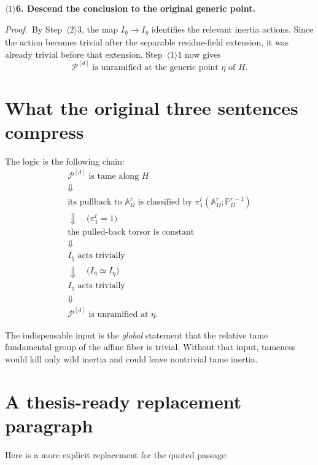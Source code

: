 \documentclass[11pt]{article}
\newcommand{\cP}{\mathcal P}
\newcommand{\step}[2]{\par\medskip\noindent
  \textcolor{heading}{\textbf{\(\langle #1\rangle\)#2}}\quad}
\newcommand{\pf}{\par\smallskip\noindent\textit{Proof.}\ }
\begin{document}
\step{1}{6. Descend the conclusion to the original generic point.}

\pf By Step~$\langle2\rangle3$, the map
$I_{\bar\eta}\to I_\eta$ identifies the relevant inertia actions.  Since
the action becomes trivial after the separable residue-field extension, it
was already trivial before that extension.  Step~$\langle1\rangle1$ now
gives
\[
  \boxed{\cP^{[d]}\text{ is unramified at the generic point }\eta\text{ of }H.}
\]

\section*{What the original three sentences compress}

The logic is the following chain:
\[
\begin{gathered}
  \text{$\cP^{[d]}$ is tame along $H$}
  \\
  \Downarrow
  \\
  \text{its pullback to $\mathbb A^r_\Omega$ is classified by }
  \pi_1^t(\mathbb A^r_\Omega;\mathbb P^{r-1}_\Omega)
  \\
  \Downarrow\quad\bigl(\pi_1^t=1\bigr)
  \\
  \text{the pulled-back torsor is constant}
  \\
  \Downarrow
  \\
  I_{\bar\eta}\text{ acts trivially}
  \\
  \Downarrow\quad\bigl(I_{\bar\eta}\simeq I_\eta\bigr)
  \\
  I_\eta\text{ acts trivially}
  \\
  \Downarrow
  \\
  \text{$\cP^{[d]}$ is unramified at $\eta$.}
\end{gathered}
\]

The indispensable input is the \emph{global} statement that the relative
tame fundamental group of the affine fiber is trivial.  Without that input,
tameness would kill only wild inertia and could leave nontrivial tame
inertia.

\section*{A thesis-ready replacement paragraph}

Here is a more explicit replacement for the quoted passage:
\end{document}
